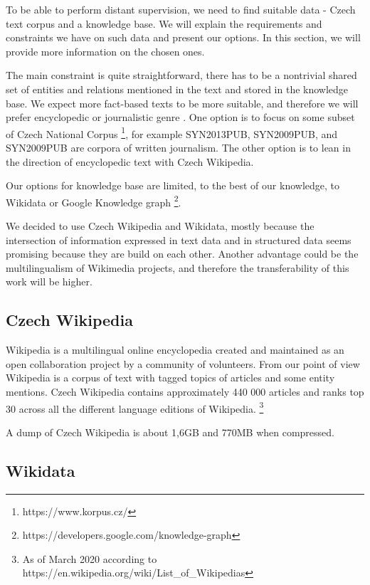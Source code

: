 To be able to perform distant supervision, we need to find suitable data - Czech text corpus and a knowledge base. We will explain the requirements and constraints we have on such data and present our options. In this section, we will provide more information on the chosen ones.

The main constraint is quite straightforward, there has to be a nontrivial shared set of entities and relations mentioned in the text and stored in the knowledge base. We expect more fact-based texts to be more suitable, and therefore we will prefer encyclopedic or journalistic genre . One option is to focus on some subset of Czech National Corpus \footnote{https://www.korpus.cz/}, for example SYN2013PUB, SYN2009PUB, and SYN2009PUB are corpora of written journalism. The other option is to lean in the direction of encyclopedic text with Czech Wikipedia.

Our options for knowledge base are limited, to the best of our knowledge, to Wikidata or Google Knowledge graph \footnote{https://developers.google.com/knowledge-graph}.

We decided to use Czech Wikipedia and Wikidata, mostly because the intersection of information expressed in text data and in structured data seems promising because they are build on each other. Another advantage could be the multilingualism of Wikimedia projects, and therefore the transferability of this work will be higher. 


\subsection{Czech Wikipedia}

Wikipedia is a multilingual online encyclopedia created and maintained as an open collaboration project by a community of volunteers\cite{wiki:wiki}. From our point of view Wikipedia is a corpus of text with tagged topics of articles and some entity mentions. Czech Wikipedia contains approximately 440 000 articles and ranks top 30 across all the different language editions of Wikipedia.
\footnote{As of March 2020 according to https://en.wikipedia.org/wiki/List\_of\_Wikipedias}

A dump of Czech Wikipedia is about 1,6GB and 770MB when compressed.

\subsection{Wikidata}

